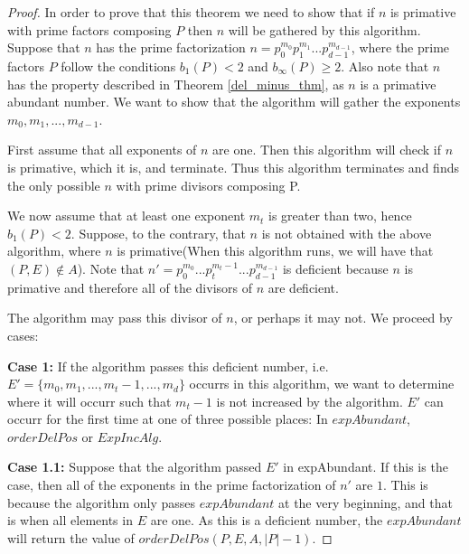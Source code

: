 \documentclass[../paper.tex]{subfiles}
\begin{document}
\begin{proof}
  In order to prove that this theorem we need to show that if $n$
is primative with prime factors composing $P$ then $n$ 
will be gathered by this algorithm. Suppose that $n$ has the
prime factorization $n = p_0^{m_0} p_1^{m_1} ...
p_{d-1}^{m_{d-1}}$, where the prime factors $P$ follow the
conditions $b_1(P) < 2$ and $b_{\infty}(P) \geq 2$. Also note 
that $n$ has the property described in Theorem
{\ref{del_minus_thm}}, as $n$ is a primative abundant number. 
We want to show that the algorithm will gather the exponents 
$m_0, m_1, ..., m_{d-1}$. 

  First assume that all exponents of $n$ are one. Then this
algorithm will check if $n$ is primative, which it is, and
terminate. Thus this algorithm terminates and finds the only
possible $n$ with prime divisors composing P. 


  We now assume that at least one exponent $m_t$ is greater than
two, hence $b_1(P) < 2$. Suppose, to the contrary, that $n$ is not
obtained with the above algorithm, where $n$ is primative(When
this algorithm runs, we will have that $(P,E) \notin A$). Note that 
$n' = p_0^{m_0}...p_t^{m_t - 1}...p_{d-1}^{m_{d-1}}$ is deficient 
because $n$ is primative and therefore all of the divisors of $n$
are deficient. 

  The algorithm may pass this divisor of $n$, or perhaps it may
not. We proceed by cases:

\textbf{Case 1:}
  If the algorithm passes this deficient number, 
i.e. $E' = \{m_0, m_1, ..., m_t - 1, ..., m_d \}$ occurrs in this 
algorithm, we want to determine where it will occurr such that 
$m_t - 1$ is not increased by the algorithm. $E'$ can occurr for
the first time at one of three possible places: In $expAbundant$, 
$orderDelPos$ or $ExpIncAlg$.

\textbf{Case 1.1:}  
  Suppose that the algorithm passed $E'$ in expAbundant. If this
is the case, then all of the exponents in the prime factorization
of $n'$ are $1$. This is because the algorithm only passes
$expAbundant$ at the very beginning, and that is when all elements
in $E$ are one. As this is a deficient number, the $expAbundant$
will return the value of $orderDelPos(P,E,A,|P| - 1)$.



\end{proof}
\end{document}
